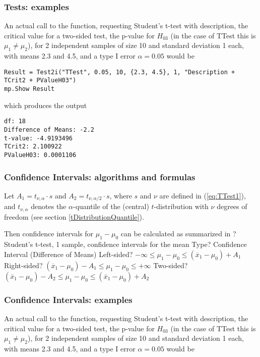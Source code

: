 \subsubsection{Tests: examples}
An actual call to the function, requesting Student's t-test with description, the critical value for a two-sided test, the p-value for $H_{03}$ (in the case of \textsf{TTest} this is $\mu_1 \neq \mu_2$), for 2 independent samples of size 10 and standard deviation 1 each, with means 2.3 and 4.5, and a type I error $\alpha=0.05$ would be

\begin{lstlisting}
Result = Test2i("TTest", 0.05, 10, {2.3, 4.5}, 1, "Description + TCrit2 + PValueH03")
mp.Show Result
\end{lstlisting}
which produces the output

\begin{verbatim}
df: 18
Difference of Means: -2.2
t-value: -4.9193496
TCrit2: 2.100922
PValueH03: 0.0001106
\end{verbatim}




\subsubsection{Confidence Intervals: algorithms and formulas}
\label{1SampleTTest_CI}

Let $A_1=t_{\nu,\alpha} \cdot s$ and $A_2=t_{\nu,\alpha/2} \cdot s$, where $s$ and $\nu$ are defined in (\ref{eq:TTest1}), and $t_{\nu,\alpha}$ denotes the $\alpha$-quantile of the (central) $t$-distribution with $\nu$ degrees of freedom (see section \ref{tDistributionQuantile}). 


\mpTableTwoColsThreeRows
{Then confidence intervals for $\mu_1 - \mu_0$ can be calculated as summarized in ? Student's t-test, 1 sample, confidence intervals for the mean}
{Type? Confidence Interval (Difference of Means)}
{Left-sided? $-\infty \leq \mu_1 - \mu_0 \leq (\overline{x}_1-\mu_0)  + A_1$}
{Right-sided? $(\overline{x}_1-\mu_0 ) - A_1 \leq \mu_1 - \mu_0 \leq +\infty$}
{Two-sided? $(\overline{x}_1-\mu_0 ) - A_2 \leq \mu_1 - \mu_0 \leq (\overline{x}_1-\mu_0 ) + A_2$}



\subsubsection{Confidence Intervals: examples}
An actual call to the function, requesting Student's t-test with description, the critical value for a two-sided test, the p-value for $H_{03}$ (in the case of \textsf{TTest} this is $\mu_1 \neq \mu_2$), for 2 independent samples of size 10 and standard deviation 1 each, with means 2.3 and 4.5, and a type I error $\alpha=0.05$ would be


